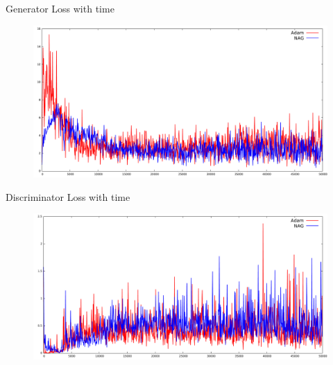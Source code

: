 \documentclass[10pt]{beamer}
\begin{document}
\begin{frame}{Generator Loss with time}
\begin{figure}
\centering
\includegraphics[width=\linewidth]{./images/genr-gan.pdf}
\end{figure}
\end{frame}
\begin{frame}{Discriminator Loss with time}
\begin{figure}
\centering
\includegraphics[width=\linewidth]{./images/disc-gan.pdf}
\end{figure}
\end{frame}
\end{document}

